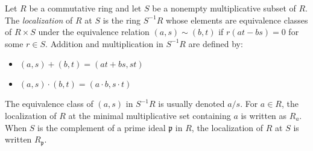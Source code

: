 \documentclass{article}
\begin{document}
Let $R$ be a commutative ring and let $S$ be a nonempty multiplicative subset of $R$. The {\em localization} of $R$ at $S$ is the ring $S^{-1} R$ whose elements are equivalence classes of $R \times S$ under the equivalence relation $(a,s) \sim (b,t)$ if $r(at - bs) = 0$ for some $r \in S$. Addition and multiplication in $S^{-1}R$ are defined by:
\begin{itemize}
\item $(a,s) + (b,t) = (at+bs,st)$
\item $(a,s) \cdot (b,t) = (a \cdot b,s \cdot t)$
\end{itemize}
The equivalence class of $(a,s)$ in $S^{-1}R$ is usually denoted $a/s$. For $a \in R$, the localization of $R$ at the minimal multiplicative set containing $a$ is written as $R_a$. When $S$ is the complement of a prime ideal $\mathfrak{p}$ in $R$, the localization of $R$ at $S$ is written $R_{\mathfrak{p}}$.
\end{document}
